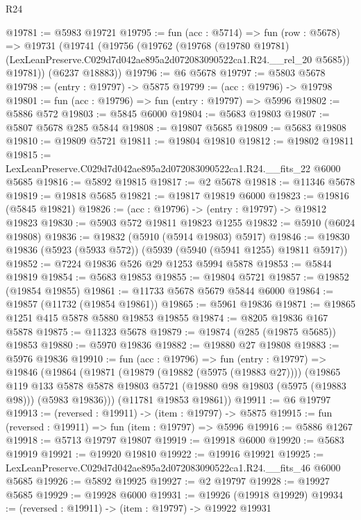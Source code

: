 \begin{lexlean}{R24}
\begin{coremodule}
@19781 := @5983 @19721
@19795 := fun (acc : @5714) =>
  fun (row : @5678) =>
  @19731
    (@19741
      (@19756
        (@19762
          (@19768
            (@19780 @19781)
            (LexLeanPreserve.C029d7d042ae895a2d072083090522ca1.R24.__rel_20 @5685))
          @19781))
      (@6237 @18883))
@19796 := @6 @5678
@19797 := @5803 @5678
@19798 := (entry : @19797) -> @5875
@19799 := (acc : @19796) -> @19798
@19801 := fun (acc : @19796) => fun (entry : @19797) => @5996
@19802 := @5886 @572
@19803 := @5845 @6000
@19804 := @5683 @19803
@19807 := @5807 @5678 @285 @5844
@19808 := @19807 @5685
@19809 := @5683 @19808
@19810 := @19809 @5721
@19811 := @19804 @19810
@19812 := @19802 @19811
@19815 := LexLeanPreserve.C029d7d042ae895a2d072083090522ca1.R24.__fits_22 @6000 @5685
@19816 := @5892 @19815
@19817 := @2 @5678
@19818 := @11346 @5678
@19819 := @19818 @5685
@19821 := @19817 @19819 @6000
@19823 := @19816 (@5845 @19821)
@19826 := (acc : @19796) -> (entry : @19797) -> @19812 @19823
@19830 := @5903 @572 @19811 @19823 @1255
@19832 := @5910 (@6024 @19808)
@19836 := @19832 (@5910 (@5914 @19803) @5917)
@19846 := @19830 @19836 (@5923 (@5933 @572)) (@5939 (@5940 (@5941 @1255) @19811 @5917))
@19852 := @7224 @19836 @526 @29 @1253 @5994 @5878
@19853 := @5844 @19819
@19854 := @5683 @19853
@19855 := @19804 @5721
@19857 := @19852 (@19854 @19855)
@19861 := @11733 @5678 @5679 @5844 @6000
@19864 := @19857 (@11732 (@19854 @19861))
@19865 := @5961 @19836
@19871 := @19865 @1251 @415 @5878 @5880 @19853 @19855
@19874 := @8205 @19836 @167 @5878
@19875 := @11323 @5678
@19879 := @19874 (@285 (@19875 @5685)) @19853
@19880 := @5970 @19836
@19882 := @19880 @27 @19808
@19883 := @5976 @19836
@19910 := fun (acc : @19796) =>
  fun (entry : @19797) =>
  @19846
    (@19864
      (@19871
        (@19879 (@19882 (@5975 (@19883 @27))))
        (@19865
          @119
          @133
          @5878
          @5878
          @19803
          @5721
          (@19880 @98 @19803 (@5975 (@19883 @98)))
          (@5983 @19836)))
      (@11781 @19853 @19861))
@19911 := @6 @19797
@19913 := (reversed : @19911) -> (item : @19797) -> @5875
@19915 := fun (reversed : @19911) => fun (item : @19797) => @5996
@19916 := @5886 @1267
@19918 := @5713 @19797 @19807
@19919 := @19918 @6000
@19920 := @5683 @19919
@19921 := @19920 @19810
@19922 := @19916 @19921
@19925 := LexLeanPreserve.C029d7d042ae895a2d072083090522ca1.R24.__fits_46 @6000 @5685
@19926 := @5892 @19925
@19927 := @2 @19797
@19928 := @19927 @5685
@19929 := @19928 @6000
@19931 := @19926 (@19918 @19929)
@19934 := (reversed : @19911) -> (item : @19797) -> @19922 @19931

\end{coremodule}
\end{lexlean}
